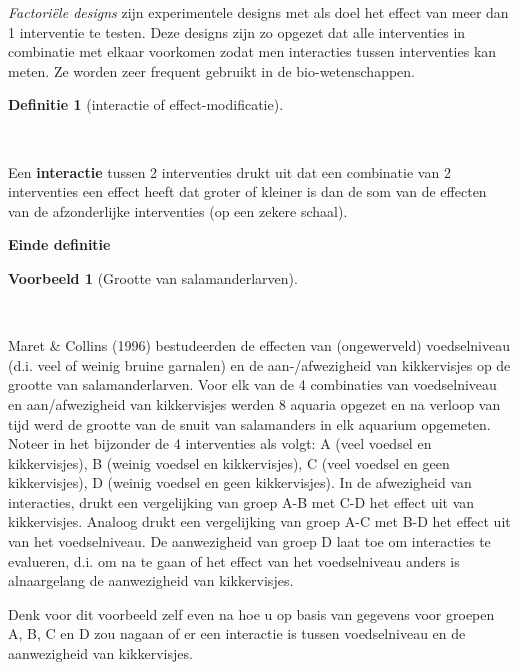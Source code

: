 \documentclass[
  dutch,
  letterpaper,
  12pt]{book}
\theoremstyle{definition}
\theoremstyle{definition}
\newtheorem{definition}{Definitie}[chapter]
\theoremstyle{definition}
\newtheorem{example}{Voorbeeld}[chapter]
\theoremstyle{remark}
\begin{document}
\emph{Factoriële designs} zijn experimentele designs met als doel het
effect van meer dan 1 interventie te testen. Deze designs zijn zo
opgezet dat alle interventies in combinatie met elkaar voorkomen zodat
men interacties tussen interventies kan meten. Ze worden zeer frequent
gebruikt in de bio-wetenschappen.

\begin{definition}[interactie of
effect-modificatie]\protect\hypertarget{def-interactie-of-effect-modificatie}{}\label{def-interactie-of-effect-modificatie}

~

\end{definition}

Een \textbf{interactie} tussen 2 interventies drukt uit dat een
combinatie van 2 interventies een effect heeft dat groter of kleiner is
dan de som van de effecten van de afzonderlijke interventies (op een
zekere schaal).

\textbf{Einde definitie}

\begin{example}[Grootte van
salamanderlarven]\protect\hypertarget{exm-grootte-van-salamanderlarven}{}\label{exm-grootte-van-salamanderlarven}

~

\end{example}

Maret \& Collins (1996) bestudeerden de effecten van (ongewerveld)
voedselniveau (d.i. veel of weinig bruine garnalen) en de
aan-/afwezigheid van kikkervisjes op de grootte van salamanderlarven.
Voor elk van de 4 combinaties van voedselniveau en aan/afwezigheid van
kikkervisjes werden 8 aquaria opgezet en na verloop van tijd werd de
grootte van de snuit van salamanders in elk aquarium opgemeten. Noteer
in het bijzonder de 4 interventies als volgt: A (veel voedsel en
kikkervisjes), B (weinig voedsel en kikkervisjes), C (veel voedsel en
geen kikkervisjes), D (weinig voedsel en geen kikkervisjes). In de
afwezigheid van interacties, drukt een vergelijking van groep A-B met
C-D het effect uit van kikkervisjes. Analoog drukt een vergelijking van
groep A-C met B-D het effect uit van het voedselniveau. De aanwezigheid
van groep D laat toe om interacties te evalueren, d.i. om na te gaan of
het effect van het voedselniveau anders is alnaargelang de aanwezigheid
van kikkervisjes.

Denk voor dit voorbeeld zelf even na hoe u op basis van gegevens voor
groepen A, B, C en D zou nagaan of er een interactie is tussen
voedselniveau en de aanwezigheid van kikkervisjes.
\end{document}

